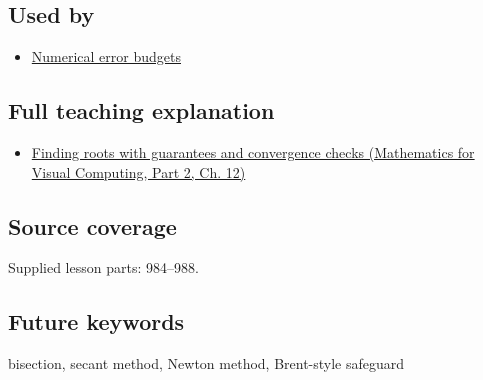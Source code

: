 \subsection{Used by}\label{appendix-f63eb850796d-used-by}

\hypertarget{appendix-f63eb850796d-used-by}{}

\begin{itemize}
\tightlist
\item
  \hyperref[appendix-31b8c295e05f]{Numerical error budgets}
\end{itemize}

\subsection{Full teaching explanation}\label{appendix-f63eb850796d-full-teaching-explanation}

\hypertarget{appendix-f63eb850796d-full-teaching-explanation}{}

\begin{itemize}
\tightlist
\item
  \href{../02-Mathematics-for-Visual-Computing-P02/main.pdf\#nameddest=02-foundations-ii-ch028-finding-roots-with-guarantees-and-convergence-checks}{Finding roots with guarantees and convergence checks (Mathematics for Visual Computing, Part 2, Ch. 12)}
\end{itemize}

\subsection{Source coverage}\label{appendix-f63eb850796d-source-coverage}

\hypertarget{appendix-f63eb850796d-source-coverage}{}

Supplied lesson parts: 984--988.

\subsection{Future keywords}\label{appendix-f63eb850796d-future-keywords}

\hypertarget{appendix-f63eb850796d-future-keywords}{}

bisection, secant method, Newton method, Brent-style safeguard
